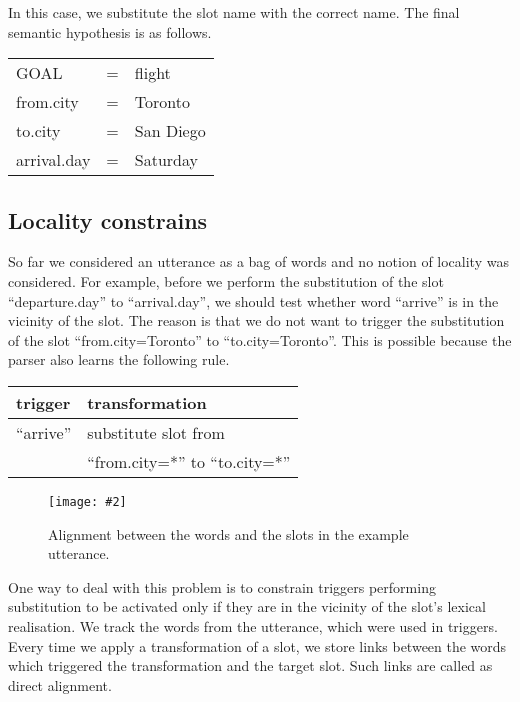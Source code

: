 \documentclass{article}
\newcommand{\fgrparam}[4]{
  \begin{figure}[htbp]
    \begin{center}
      \leavevmode
      \texttt{[image: \#2]}
    \end{center}
    \vspace{-0.5cm}
    \caption{#4}
    \label{#3}
  \end{figure}
}
\begin{document}
In this case, we substitute the slot name with the correct name. The final semantic hypothesis is as follows.

\vspace{.15cm}
\begin{tabular}{lll}
  GOAL          & = & flight \\
  from.city     & = & Toronto \\
  to.city       & = & San Diego \\
  arrival.day    & = & Saturday \\
\end{tabular} 
\vspace{.15cm}

\subsection{Locality constrains} \label{sec:locality:constrain}

So far we considered an utterance as a bag of words and no notion of locality was considered. For example, before we perform the substitution of the slot ``departure.day'' to ``arrival.day'', we should test whether word ``arrive'' is in the vicinity of the slot. The reason is that we do not want to trigger the substitution of the slot ``from.city=Toronto'' to ``to.city=Toronto''. This is possible  because the parser also learns the following rule. 

\vspace{.15cm}
\begin{tabular}{ll}
  trigger & transformation \\
  \hline 
  ``arrive''            & substitute slot from\\
                        & ``from.city=*'' to ``to.city=*'' \\
\end{tabular} 
\vspace{.15cm}
\fgrparam{width=8cm}{./fig/words-slots-alignment.pdf}{fig:alignment}{Alignment between the words and the slots in the example utterance.}


One way to deal with this problem is to constrain triggers performing substitution to be activated only if they are in the vicinity of the slot's lexical realisation. We track the words from the utterance, which were used in triggers. Every time we apply a transformation of a slot, we store links between the words which triggered the transformation and the target slot. Such links are called as direct alignment. 
\end{document}

